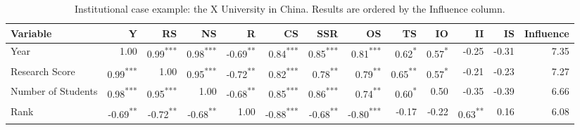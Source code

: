 \documentclass[conference]{IEEEtran}
\begin{document}
\begin{table*}[h!]
	\centering
	\caption{Institutional case example: the X University in China. Results are ordered by the Influence column.}
	\label{tab:correlation_a_university}
	\scriptsize
	\begin{tabular}{|l|r|r|r|r|r|r|r|r|r|r|r|r|}
		\hline

	\textbf{Variable} & \textbf{Y} & \textbf{RS} & \textbf{NS} & \textbf{R} & \textbf{CS} & \textbf{SSR} & \textbf{OS} & \textbf{TS} & \textbf{IO} & \textbf{II} & \textbf{IS} & \textbf{Influence} \\
	\hline
	
	Year & \cellcolor{gray!50}1.00 & \cellcolor{gray!49}0.99\textsuperscript{***} & \cellcolor{gray!49}0.98\textsuperscript{***} & \cellcolor{gray!34}-0.69\textsuperscript{**} & \cellcolor{gray!42}0.84\textsuperscript{***} & \cellcolor{gray!42}0.85\textsuperscript{***} & \cellcolor{gray!40}0.81\textsuperscript{***} & \cellcolor{gray!31}0.62\textsuperscript{*} & \cellcolor{gray!28}0.57\textsuperscript{*} & \cellcolor{gray!12}-0.25 & \cellcolor{gray!15}-0.31 & 7.35 \\
	
	Research Score & \cellcolor{gray!49}0.99\textsuperscript{***} & \cellcolor{gray!50}1.00 & \cellcolor{gray!47}0.95\textsuperscript{***} & \cellcolor{gray!36}-0.72\textsuperscript{**} & \cellcolor{gray!41}0.82\textsuperscript{***} & \cellcolor{gray!39}0.78\textsuperscript{**} & \cellcolor{gray!39}0.79\textsuperscript{**} & \cellcolor{gray!32}0.65\textsuperscript{**} & \cellcolor{gray!28}0.57\textsuperscript{*} & \cellcolor{gray!10}-0.21 & \cellcolor{gray!11}-0.23 & 7.27 \\
	
	Number of Students & \cellcolor{gray!49}0.98\textsuperscript{***} & \cellcolor{gray!47}0.95\textsuperscript{***} & \cellcolor{gray!50}1.00 & \cellcolor{gray!34}-0.68\textsuperscript{**} & \cellcolor{gray!42}0.85\textsuperscript{***} & \cellcolor{gray!43}0.86\textsuperscript{***} & \cellcolor{gray!37}0.74\textsuperscript{**} & \cellcolor{gray!30}0.60\textsuperscript{*} & \cellcolor{gray!25}0.50 & \cellcolor{gray!17}-0.35 & \cellcolor{gray!13}-0.39 & 6.66 \\
	
	Rank & \cellcolor{gray!34}-0.69\textsuperscript{**} & \cellcolor{gray!36}-0.72\textsuperscript{**} & \cellcolor{gray!34}-0.68\textsuperscript{**} & \cellcolor{gray!50}1.00 & \cellcolor{gray!50}-0.88\textsuperscript{***} & \cellcolor{gray!22}-0.68\textsuperscript{**} & \cellcolor{gray!40}-0.80\textsuperscript{***} & \cellcolor{gray!8}-0.17 & \cellcolor{gray!11}-0.22 & \cellcolor{gray!31}0.63\textsuperscript{**} & \cellcolor{gray!8}0.16 & 6.08 \\
	

\end{tabular}
\end{table*}
\end{document}
